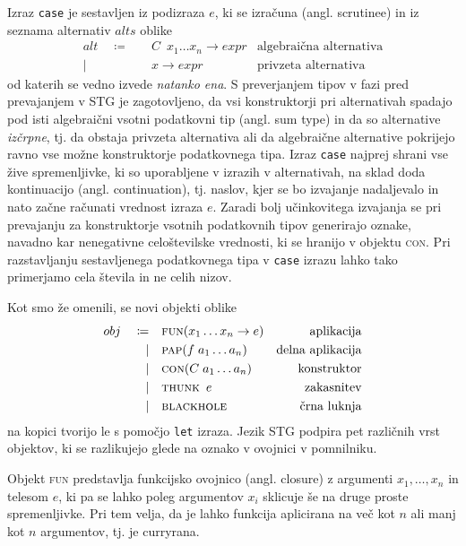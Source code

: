 Izraz \texttt{case} je sestavljen iz podizraza $e$, ki se izračuna (angl. scrutinee) in iz seznama alternativ $alts$ oblike
\begin{align*}
	alt \quad \coloneq& \quad C \enspace x_1 \dots x_n \to expr & \text{algebraična alternativa}\\
	\vert& \quad x \to expr & \text{privzeta alternativa}
\end{align*}
od katerih se vedno izvede \textit{natanko ena}. S preverjanjem tipov v fazi pred prevajanjem v STG je zagotovljeno, da vsi konstruktorji pri alternativah spadajo pod isti algebraični vsotni podatkovni tip (angl. sum type) in da so alternative \textit{izčrpne}, tj. da obstaja privzeta alternativa ali da algebraične alternative pokrijejo ravno vse možne konstruktorje podatkovnega tipa. Izraz \texttt{case} najprej shrani vse žive spremenljivke, ki so uporabljene v izrazih v alternativah, na sklad doda kontinuacijo (angl. continuation), tj. naslov, kjer se bo izvajanje nadaljevalo in nato začne računati vrednost izraza $e$. Zaradi bolj učinkovitega izvajanja se pri prevajanju za konstruktorje vsotnih podatkovnih tipov generirajo oznake, navadno kar nenegativne celoštevilske vrednosti, ki se hranijo v objektu \textsc{con}. Pri razstavljanju sestavljenega podatkovnega tipa v \texttt{case} izrazu lahko tako primerjamo cela števila in ne celih nizov.

Kot smo že omenili, se novi objekti oblike
\begin{align*}
	obj \quad \coloneq& \quad \textsc{fun}(x_1 \dots x_n \to e) & \text{aplikacija}\\
	\vert& \quad \textsc{pap}(f \; a_1 \dots a_n) & \text{delna aplikacija}\\
	\vert& \quad \textsc{con}(C \; a_1 \dots a_n) & \text{konstruktor}\\
	\vert& \quad \textsc{thunk} \enspace e & \text{zakasnitev}\\
	\vert& \quad \textsc{blackhole} & \text{črna luknja}
\end{align*}
na kopici tvorijo le s pomočjo \texttt{let} izraza. Jezik STG podpira pet različnih vrst objektov, ki se razlikujejo glede na oznako v ovojnici v pomnilniku.

Objekt \textsc{fun} predstavlja funkcijsko ovojnico (angl. closure) z argumenti $x_1, \dots, x_n$ in telesom $e$, ki pa se lahko poleg argumentov $x_i$ sklicuje še na druge proste spremenljivke. Pri tem velja, da je lahko funkcija aplicirana na več kot $n$ ali manj kot $n$ argumentov, tj. je curryrana.

